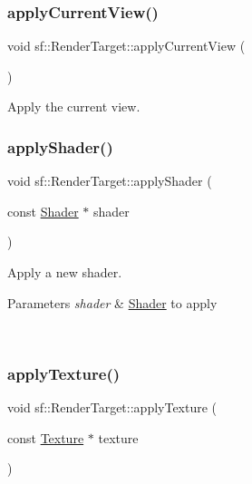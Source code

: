 \subsubsection{\texorpdfstring{applyCurrentView()}{applyCurrentView()}}
{\footnotesize\ttfamily void sf\+::\+Render\+Target\+::apply\+Current\+View (\begin{DoxyParamCaption}{ }\end{DoxyParamCaption})\hspace{0.3cm}{\ttfamily [private]}}



Apply the current view. 

\begin{DoxyVerb}\end{DoxyVerb}
 \mbox{\label{classsf_1_1_render_target_a6f8bc92f07c70ccd57cbf632fe9de0ba}} 
\subsubsection{\texorpdfstring{applyShader()}{applyShader()}}
{\footnotesize\ttfamily void sf\+::\+Render\+Target\+::apply\+Shader (\begin{DoxyParamCaption}\item[{const \mbox{\hyperlink{classsf_1_1_shader}{Shader}} $\ast$}]{shader }\end{DoxyParamCaption})\hspace{0.3cm}{\ttfamily [private]}}



Apply a new shader. 


\begin{DoxyParams}{Parameters}
{\em shader} & \mbox{\hyperlink{classsf_1_1_shader}{Shader}} to apply \begin{DoxyVerb}\end{DoxyVerb}
 \\
\hline
\end{DoxyParams}
\mbox{\label{classsf_1_1_render_target_afb8a49305171aad158a27e0dfbb03709}} 
\subsubsection{\texorpdfstring{applyTexture()}{applyTexture()}}
{\footnotesize\ttfamily void sf\+::\+Render\+Target\+::apply\+Texture (\begin{DoxyParamCaption}\item[{const \mbox{\hyperlink{classsf_1_1_texture}{Texture}} $\ast$}]{texture }\end{DoxyParamCaption})\hspace{0.3cm}{\ttfamily [private]}}



